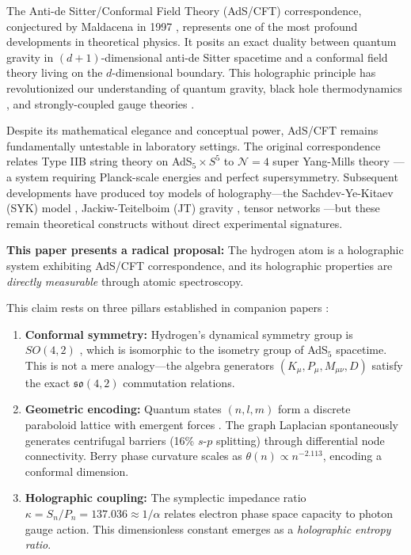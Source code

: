 \documentclass[aps,prd,twocolumn,superscriptaddress,floatfix]{revtex4-2}
\begin{document}
The Anti-de Sitter/Conformal Field Theory (AdS/CFT) correspondence, conjectured by Maldacena in 1997 \cite{maldacena1998}, represents one of the most profound developments in theoretical physics. It posits an exact duality between quantum gravity in $(d+1)$-dimensional anti-de Sitter spacetime and a conformal field theory living on the $d$-dimensional boundary. This holographic principle \cite{thooft1993,susskind1995} has revolutionized our understanding of quantum gravity, black hole thermodynamics \cite{bekenstein1973,hawking1975}, and strongly-coupled gauge theories \cite{gubser1998,witten1998a}.

Despite its mathematical elegance and conceptual power, AdS/CFT remains fundamentally untestable in laboratory settings. The original correspondence relates Type IIB string theory on AdS$_5 \times S^5$ to $\mathcal{N}=4$ super Yang-Mills theory \cite{maldacena1998}---a system requiring Planck-scale energies and perfect supersymmetry. Subsequent developments have produced toy models of holography---the Sachdev-Ye-Kitaev (SYK) model \cite{sachdev1993,kitaev2015}, Jackiw-Teitelboim (JT) gravity \cite{jackiw1985,teitelboim1983}, tensor networks \cite{swingle2012}---but these remain theoretical constructs without direct experimental signatures.

\textbf{This paper presents a radical proposal:} The hydrogen atom is a holographic system exhibiting AdS/CFT correspondence, and its holographic properties are \textit{directly measurable} through atomic spectroscopy.

This claim rests on three pillars established in companion papers \cite{companion_lattice,companion_alpha}:

\begin{enumerate}
\item \textbf{Conformal symmetry:} Hydrogen's dynamical symmetry group is $SO(4,2)$ \cite{barut1967,fock1935}, which is isomorphic to the isometry group of AdS$_5$ spacetime. This is not a mere analogy---the algebra generators $(K_\mu, P_\mu, M_{\mu\nu}, D)$ satisfy the exact $\mathfrak{so}(4,2)$ commutation relations.

\item \textbf{Geometric encoding:} Quantum states $(n,l,m)$ form a discrete paraboloid lattice with emergent forces \cite{companion_lattice}. The graph Laplacian spontaneously generates centrifugal barriers (16\% $s$-$p$ splitting) through differential node connectivity. Berry phase curvature scales as $\theta(n) \propto n^{-2.113}$, encoding a conformal dimension.

\item \textbf{Holographic coupling:} The symplectic impedance ratio $\kappa = S_n/P_n = 137.036 \approx 1/\alpha$ \cite{companion_alpha} relates electron phase space capacity to photon gauge action. This dimensionless constant emerges as a \textit{holographic entropy ratio}.
\end{enumerate}
\end{document}
